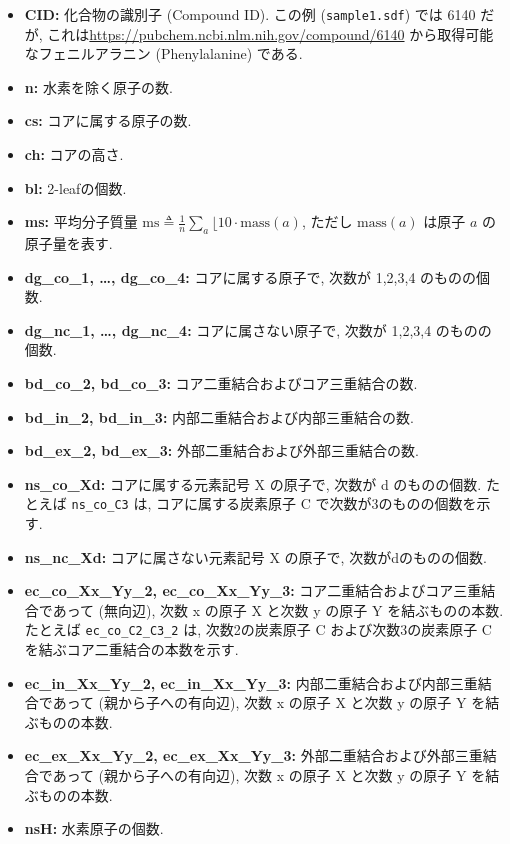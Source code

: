 \documentclass[11pt, titlepage, dvipdfmx, twoside]{jarticle}
\begin{document}
\begin{itemize}
\item {\bf CID:} 化合物の識別子 (Compound ID).
  この例 ({\tt sample1.sdf}) では 6140 だが, これは\url{https://pubchem.ncbi.nlm.nih.gov/compound/6140} から取得可能なフェニルアラニン (Phenylalanine) である.
\item {\bf n:} 水素を除く原子の数.
\item {\bf cs:} コアに属する原子の数.
\item {\bf ch:} コアの高さ.
\item {\bf bl:} 2-leafの個数.
\item {\bf ms:} 平均分子質量 $\textrm{ms}\triangleq\frac{1}{n}\sum_{a}\lfloor 10 \cdot \textrm{mass}(a)$, ただし $\textrm{mass}(a)$ は原子 $a$ の原子量を表す.
\item {\bf dg\_co\_1, \dots, dg\_co\_4:} コアに属する原子で, 次数が 1,2,3,4 のものの個数.
\item {\bf dg\_nc\_1, \dots, dg\_nc\_4:} コアに属さない原子で, 次数が 1,2,3,4 のものの個数. 
\item {\bf bd\_co\_2, bd\_co\_3:} コア二重結合およびコア三重結合の数.
\item {\bf bd\_in\_2, bd\_in\_3:} 内部二重結合および内部三重結合の数.
\item {\bf bd\_ex\_2, bd\_ex\_3:} 外部二重結合および外部三重結合の数.
\item {\bf ns\_co\_Xd:} コアに属する元素記号 X の原子で,
  次数が d のものの個数.
  たとえば {\tt ns\_co\_C3} は, コアに属する炭素原子 C で次数が3のものの個数を示す.
\item {\bf ns\_nc\_Xd:} コアに属さない元素記号 X の原子で, 次数がdのものの個数.
\item {\bf ec\_co\_Xx\_Yy\_2, ec\_co\_Xx\_Yy\_3:}
  コア二重結合およびコア三重結合であって (無向辺),
  次数 x の原子 X と次数 y の原子 Y を結ぶものの本数.
  たとえば {\tt ec\_co\_C2\_C3\_2} は,
  次数2の炭素原子 C および次数3の炭素原子 C を結ぶコア二重結合の本数を示す.
\item {\bf ec\_in\_Xx\_Yy\_2, ec\_in\_Xx\_Yy\_3:}
  内部二重結合および内部三重結合であって (親から子への有向辺),
  次数 x の原子 X と次数 y の原子 Y を結ぶものの本数.
\item {\bf ec\_ex\_Xx\_Yy\_2, ec\_ex\_Xx\_Yy\_3:}
  外部二重結合および外部三重結合であって (親から子への有向辺),
  次数 x の原子 X と次数 y の原子 Y を結ぶものの本数.
\item {\bf nsH:} 水素原子の個数.
\end{itemize}
\end{document}
